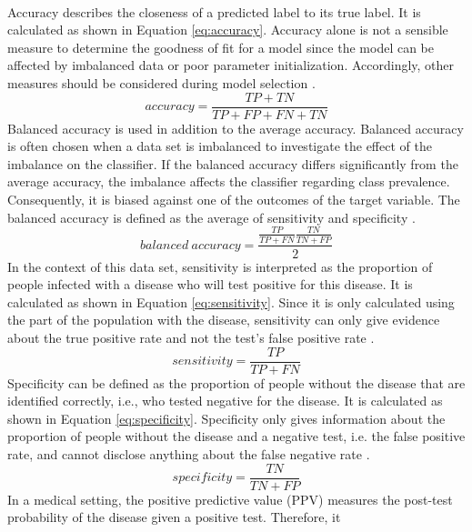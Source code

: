 \\
Accuracy describes the closeness of a predicted label to its true 
label. It is calculated as shown in Equation \ref{eq:accuracy}. Accuracy alone 
is not a sensible measure to determine the goodness of fit for a model since 
the model can be affected by imbalanced data or poor parameter initialization. 
Accordingly, other measures should be considered during model selection 
\cite{RN167}.
\begin{equation}
 accuracy = \frac{TP + TN}{TP+FP+FN+TN}
 \label{eq:accuracy}
\end{equation}
Balanced accuracy is used in addition to the average accuracy. Balanced 
accuracy is often chosen when a data set is imbalanced to investigate the 
effect of the imbalance on the classifier. If the balanced accuracy differs 
significantly from the average accuracy, the imbalance affects the classifier 
regarding class prevalence. Consequently, it is biased against one of the 
outcomes of the target variable. The balanced accuracy is defined as the 
average of sensitivity and specificity \cite{RN167, RN127}.
\begin{equation}
 balanced \ accuracy = \frac{\frac{TP}{TP+FN}\frac{TN}{TN+FP}}{2}
 \label{eq:balanced_acc}
\end{equation}
In the context of this data set, sensitivity is interpreted as the proportion 
of people infected with a disease who will test positive for this disease. It 
is calculated as shown in Equation \ref{eq:sensitivity}. Since it is only 
calculated using the part of the population with the disease, sensitivity can 
only give evidence about the true positive rate and not the test's false 
positive rate \cite{RN168}.
\begin{equation}
 sensitivity = \frac{TP}{TP+FN}
 \label{eq:sensitivity}
\end{equation}
Specificity can be defined as the proportion of people without the disease that 
are identified correctly, i.e., who tested negative for the disease. It is 
calculated as shown in Equation \ref{eq:specificity}. Specificity only gives 
information about the proportion of people without the disease and a negative 
test, i.e. the false positive rate, and cannot disclose anything about the 
false negative rate \cite{RN168}.
\begin{equation}
 specificity = \frac{TN}{TN+FP}
 \label{eq:specificity}
\end{equation}
In a medical setting, the positive predictive value (PPV) measures the 
post-test probability of the disease given a positive test. Therefore, it 
